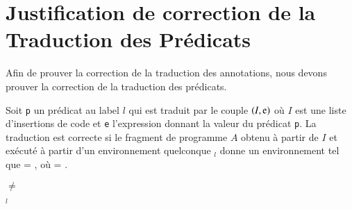   




\section{Justification de correction de la Traduction des Prédicats}
\label{sec:predicate-translation}


Afin de prouver la correction de la traduction des annotations,
nous devons prouver la correction de la traduction des prédicats.

\begin{property}
  \label{lem:pred-correct}
  Soit \lstinline'p' un prédicat au label $l$ qui est
  traduit par le couple $(I, \mbox{\lstinline'e'})$ où $I$ est une liste
  d'insertions de code et \lstinline'e' l'expression donnant la valeur du
  prédicat \lstinline'p'.
  La traduction est correcte si le fragment de programme $A$ obtenu à partir de
  $I$ et exécuté à partir d'un environnement quelconque \env$_l$ donne un
  environnement \env{} tel que
   = , où
  \env = .
\end{property}

\begin{property}
  \label{lem:pred-noerror}
  \env $\neq$ \errorenv
\end{property}

\begin{property}
  \label{lem:pred-subset}
  \env$_l$ \subenv{} \env
\end{property}

